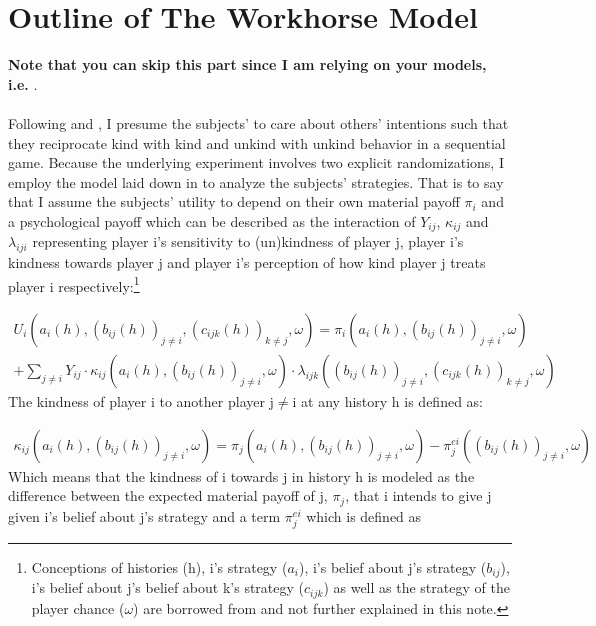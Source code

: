 \section{Outline of The Workhorse Model}
\textbf{Note that you can skip this part since I am relying on your models, i.e.} \citep{sebald2010GEB, dufwenberg2004GEB}.\\\\
Following \cite{sebald2010GEB} and \cite{dufwenberg2004GEB}, I presume the subjects' to care about others' intentions such that they reciprocate kind with kind and unkind with unkind behavior in a sequential game. Because the underlying experiment involves two explicit randomizations, I employ  the model laid down in \cite{sebald2010GEB} to analyze the subjects' strategies. That is to say that I assume the subjects' utility to depend on their own material payoff \(\pi_i\) and a psychological payoff which can be described as the interaction of \(Y_{ij}\), \(\kappa_{ij}\) and \(\lambda_{iji}\) representing player i's sensitivity to (un)kindness of player j, player i's kindness towards player j and player i's perception of how kind player j treats player i respectively:\footnote{Conceptions of histories (h), i's strategy ($a_i$), i's belief about j's strategy ($b_{ij}$), i's belief about j's belief about k's strategy ($c_{ijk}$) as well as the strategy of the player chance ($\omega$) are borrowed from \cite{geanakoplos1989GEB, dufwenberg2004GEB, sebald2010GEB} and not further explained in this note.}

\vspace{-10mm}
\begin{multline} \label{eq:1}
	U_i(a_i(h),(b_{ij}(h))_{j \neq i}, (c_{ijk}(h))_{k \neq j}, \omega) = 
	\pi_i(a_i(h),(b_{ij}(h))_{j \neq i}, \omega)\\
	+ \sum_{j \neq i} Y_{ij} \cdot \kappa_{ij}(a_i(h),(b_{ij}(h))_{j \neq i}, \omega)  
	\cdot \lambda_{ijk}((b_{ij}(h))_{j \neq i}, (c_{ijk}(h))_{k \neq j}, \omega)
\end{multline}
The kindness of player i to another player j$\neq$i at any history h is defined as:

\vspace{-10mm}
\begin{multline*}
	\kappa_{ij}(a_i(h),(b_{ij}(h))_{j \neq i}, \omega) = 
	\pi_j(a_i(h),(b_{ij}(h))_{j \neq i},\omega) 
	- \pi^{ei}_j((b_{ij}(h))_{j \neq i}, \omega)
\end{multline*}
Which means that the kindness of i towards j in history h is modeled as the difference between the expected material payoff of j, $\pi_j$, that i intends to give j given i's belief about j's strategy and a term $\pi^{ei}_j$ which is defined as

